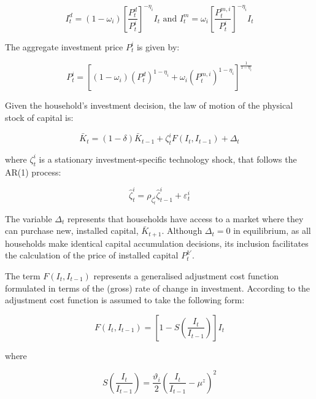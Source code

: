 \documentclass[12pt,oneside,a4paper]{article}
\begin{document}
\begin{equation}
\label{Domestic_investiment}
I_{t}^{d} =\left(1-\omega_{i}\right)\left[\frac{P_{t}^{d}}{P_{t}^{i}}\right]^{-\eta_{i}} I_{t} \text {  and  } 
I_{t}^{m} =\omega_{i}\left[\frac{P_{t}^{m, i}}{P_{t}^{i}}\right]^{-\eta_{i}} I_{t}
\end{equation}

The aggregate investment price $P_t^{i}$ is given by:

\begin{equation}
    P_{t}^{i}=\left[\left(1-\omega_{i}\right)\left(P_{t}^{d}\right)^{1-\eta_{i}}+\omega_{i}\left(P_{t}^{m, i}\right)^{1-\eta_{i}}\right]^{\frac{1}{1-\eta_{i}}}
\end{equation}


Given the household’s investment decision, the law of motion of the physical stock of capital is:

\begin{equation}
    \bar{K}_{t}=(1-\delta) \bar{K}_{t-1}+\zeta_{t}^{i} F\left(I_{t}, I_{t-1}\right)+\Delta_{t} 
\end{equation}

where $\zeta_{t}^{i}$ is a stationary investment-specific technology shock, that follows the AR(1) process:

\begin{equation}
    \hat{\zeta}_{t}^{i}=\rho_{\zeta_{t}^{i}} \hat{\zeta}_{t-1}^{i}+\varepsilon_{t}^{i}
\end{equation}

The variable $\Delta_{t} $ represents that households have access to a market where they can purchase new, installed capital, $\bar{K}_{t+1}$. Although $\Delta_{t} = 0 $ in equilibrium, as all households make identical capital accumulation decisions, its inclusion facilitates the calculation of the price of installed capital $P_t^{k'}$.

The term $F\left(I_{t}, I_{t-1}\right)$ represents a generalised adjustment cost function formulated in terms of the (gross) rate of change in investment. According to \citet{Christiano:2005} the adjustment cost function is assumed to take the following form:

\begin{equation}
    F\left(I_{t}, I_{t-1}\right)=\left[1-S\left(\frac{I_{t}}{I_{t-1}}\right)\right] I_{t}
\end{equation}

where

\begin{equation}
    S\left(\frac{I_{t}}{I_{t-1}}\right)=\frac{\vartheta_{i}}{2}\left(\frac{I_{t}}{I_{t-1}}-\mu^{z}\right)^{2}
\end{equation}
\end{document}

